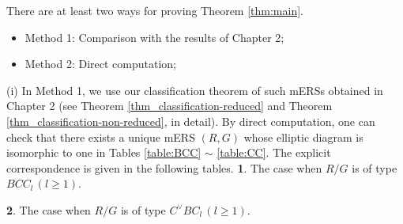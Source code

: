 \documentclass[11pt]{amsart}
\begin{document}
{There are at least two ways for proving Theorem \ref{thm:main}.
\begin{itemize}
\item[(i)] Method 1: Comparison with the results of Chapter 2;
\vskip 1mm
\item[(ii)] Method 2: Direct computation;
\end{itemize}
\vskip 3mm
\noindent
(i) In Method 1, we use our classification theorem
of such mERSs obtained in Chapter 2 (see Theorem \ref{thm_classification-reduced}
and Theorem \ref{thm_classification-non-reduced}, in detail). By direct computation,
one can check that there exists a unique mERS $(R,G)$ whose elliptic diagram
is isomorphic to one in Tables \ref{table:BCC} $\sim$ \ref{table:CC}. 
The explicit correspondence is given in the following tables.
\vskip 3mm
\noindent
{\bf 1}. The case when $R/G$ is of type $BCC_l\, (l\geq 1)$.\\[-15pt]
\begin{center}
\begin{table}[h]
\label{table:BCC-corresp}
\end{table}
\end{center}
\vskip -5mm
\noindent
{\bf 2}. The case when $R/G$ is of type $C^\vee BC_l\, (l\geq 1)$.\\[-15pt]
\begin{center}
\begin{table}[h]
\label{table:CBC-corresp}
\resizebox{.95\textwidth}{!}{%
\renewcommand{\arraystretch}{1.3}
}
\end{table}
\end{center}}
\end{document}
